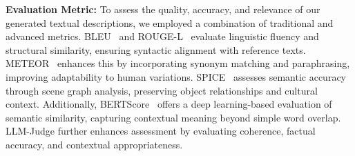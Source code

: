 \documentclass[11pt]{article}
\begin{document}
\noindent\textbf{Evaluation Metric:}
To assess the quality, accuracy, and relevance of our generated textual descriptions, we employed a combination of traditional and advanced metrics. BLEU~\cite{papineni2002bleu} and ROUGE-L~\cite{lin2004rouge} evaluate linguistic fluency and structural similarity, ensuring syntactic alignment with reference texts. METEOR~\cite{banerjee2005meteor} enhances this by incorporating synonym matching and paraphrasing, improving adaptability to human variations. 
SPICE~\cite{anderson2016spice} assesses semantic accuracy through scene graph analysis, preserving object relationships and cultural context. Additionally, BERTScore~\cite{zhang2019bertscore} offers a deep learning-based evaluation of semantic similarity, capturing contextual meaning beyond simple word overlap. LLM-Judge further enhances assessment by evaluating coherence, factual accuracy, and contextual appropriateness. 
\end{document}
